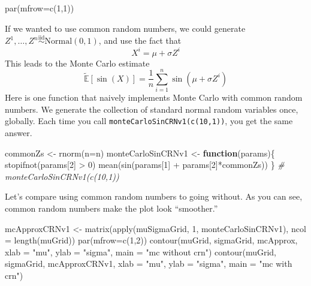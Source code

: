 \documentclass[
  12pt,
]{krantz}
\makeatletter
\newenvironment{Shaded}{\begin{snugshade}}{\end{snugshade}}
\newcommand{\AttributeTok}[1]{\textcolor[rgb]{0.61,0.61,0.61}{#1}}
\newcommand{\CommentTok}[1]{\textcolor[rgb]{0.37,0.37,0.37}{\textit{#1}}}
\newcommand{\ControlFlowTok}[1]{\textcolor[rgb]{0.27,0.27,0.27}{\textbf{#1}}}
\newcommand{\DecValTok}[1]{\textcolor[rgb]{0.06,0.06,0.06}{#1}}
\newcommand{\FunctionTok}[1]{\textcolor[rgb]{0,0,0}{#1}}
\newcommand{\NormalTok}[1]{#1}
\newcommand{\OtherTok}[1]{\textcolor[rgb]{0.37,0.37,0.37}{#1}}
\newcommand{\SpecialCharTok}[1]{\textcolor[rgb]{0,0,0}{#1}}
\newcommand{\StringTok}[1]{\textcolor[rgb]{0.5,0.5,0.5}{#1}}
\newenvironment{kframe}{%
\medskip{}
\setlength{\fboxsep}{.8em}
 \def\at@end@of@kframe{}%
 \ifinner\ifhmode%
  \def\at@end@of@kframe{\end{minipage}}%
  \begin{minipage}{\columnwidth}%
 \fi\fi%
 \def\FrameCommand##1{\hskip\@totalleftmargin \hskip-\fboxsep
 \colorbox{shadecolor}{##1}\hskip-\fboxsep
     \hskip-\linewidth \hskip-\@totalleftmargin \hskip\columnwidth}%
 \MakeFramed {\advance\hsize-\width
   \@totalleftmargin\z@ \linewidth\hsize
   \@setminipage}}%
 {\par\unskip\endMakeFramed%
 \at@end@of@kframe}
\renewenvironment{Shaded}{\begin{kframe}}{\end{kframe}}
\makeatother
\begin{document}
\begin{Shaded}
\begin{Highlighting}[]
\FunctionTok{par}\NormalTok{(}\AttributeTok{mfrow=}\FunctionTok{c}\NormalTok{(}\DecValTok{1}\NormalTok{,}\DecValTok{1}\NormalTok{))}
\end{Highlighting}
\end{Shaded}

If we wanted to use common random numbers, we could generate \(Z^1, \ldots, Z^n \overset{\text{iid}}{\sim} \text{Normal}(0, 1)\), and use the fact that
\[
X^i = \mu + \sigma Z^i
\]
This leads to the Monte Carlo estimate
\[
\tilde{\mathbb{E}}[\sin(X)] = \frac{1}{n}\sum_{i=1}^n\sin(\mu + \sigma Z^i)
\]
Here is one function that naively implements Monte Carlo with common random numbers. We generate the collection of standard normal random variables once, globally. Each time you call \texttt{monteCarloSinCRNv1(c(10,1))}, you get the same answer.

\begin{Shaded}
\begin{Highlighting}[]
\NormalTok{commonZs }\OtherTok{\textless{}{-}} \FunctionTok{rnorm}\NormalTok{(}\AttributeTok{n=}\NormalTok{n)}
\NormalTok{monteCarloSinCRNv1 }\OtherTok{\textless{}{-}} \ControlFlowTok{function}\NormalTok{(params)\{}
  \FunctionTok{stopifnot}\NormalTok{(params[}\DecValTok{2}\NormalTok{] }\SpecialCharTok{\textgreater{}} \DecValTok{0}\NormalTok{) }
  \FunctionTok{mean}\NormalTok{(}\FunctionTok{sin}\NormalTok{(params[}\DecValTok{1}\NormalTok{] }\SpecialCharTok{+}\NormalTok{ params[}\DecValTok{2}\NormalTok{]}\SpecialCharTok{*}\NormalTok{commonZs))}
\NormalTok{\} }
\CommentTok{\# monteCarloSinCRNv1(c(10,1))}
\end{Highlighting}
\end{Shaded}

Let's compare using common random numbers to going without. As you can see, common random numbers make the plot look ``smoother.''

\begin{Shaded}
\begin{Highlighting}[]
\NormalTok{mcApproxCRNv1 }\OtherTok{\textless{}{-}} \FunctionTok{matrix}\NormalTok{(}\FunctionTok{apply}\NormalTok{(muSigmaGrid, }\DecValTok{1}\NormalTok{, monteCarloSinCRNv1), }\AttributeTok{ncol =} \FunctionTok{length}\NormalTok{(muGrid))}
\FunctionTok{par}\NormalTok{(}\AttributeTok{mfrow=}\FunctionTok{c}\NormalTok{(}\DecValTok{1}\NormalTok{,}\DecValTok{2}\NormalTok{))}
\FunctionTok{contour}\NormalTok{(muGrid, sigmaGrid, mcApprox, }\AttributeTok{xlab =} \StringTok{"mu"}\NormalTok{, }\AttributeTok{ylab =} \StringTok{"sigma"}\NormalTok{, }\AttributeTok{main =} \StringTok{"mc without crn"}\NormalTok{)}
\FunctionTok{contour}\NormalTok{(muGrid, sigmaGrid, mcApproxCRNv1, }\AttributeTok{xlab =} \StringTok{"mu"}\NormalTok{, }\AttributeTok{ylab =} \StringTok{"sigma"}\NormalTok{, }\AttributeTok{main =} \StringTok{"mc with crn"}\NormalTok{)}
\end{Highlighting}
\end{Shaded}
\end{document}
